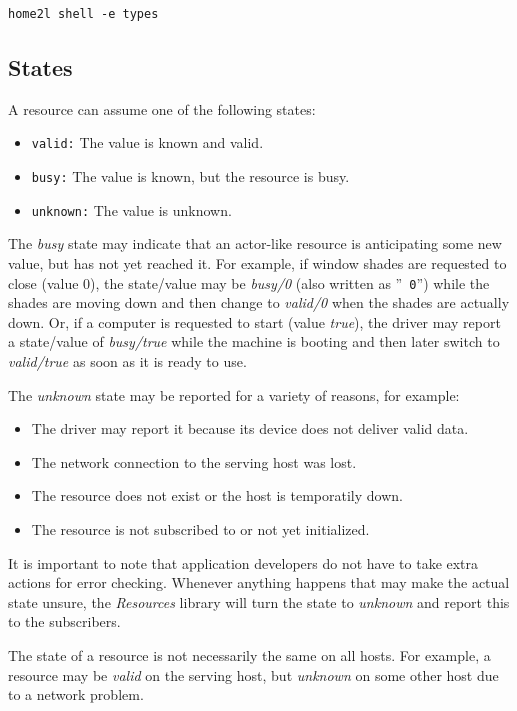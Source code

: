 \documentclass[12pt,english,parskip=half]{scrreprt}
\begin{document}
\begin{lstlisting}
home2l shell -e types
\end{lstlisting}



\subsection{States}

A resource can assume one of the following states:

\begin{itemize}
\item
  \texttt{valid:} The value is known and valid.
\item
  \texttt{busy:} The value is known, but the resource is busy.
\item
  \texttt{unknown:} The value is unknown.
\end{itemize}

The \emph{busy} state may indicate that an actor-like resource is
anticipating some new value, but has not yet reached it. For example, if
window shades are requested to close (value 0), the state/value may be
\emph{busy/0} (also written as ''\texttt{~0}'') while the shades are
moving down and then change to \emph{valid/0} when the shades are
actually down. Or, if a computer is requested to start (value \emph{true}),
the driver may report a state/value of \emph{busy/true} while
the machine is booting and then later switch to \emph{valid/true} as soon as
it is ready to use.

The \emph{unknown} state may be reported for a variety of reasons, for example:
\begin{itemize}
\item
  The driver may report it because its device does not deliver valid data.
\item
  The network connection to the serving host was lost.
\item
  The resource does not exist or the host is temporatily down.
\item
  The resource is not subscribed to or not yet initialized.
\end{itemize}

It is important to note that application developers do not have to take
extra actions for error checking. Whenever anything happens that may
make the actual state unsure, the \emph{Resources} library will turn the
state to \emph{unknown} and report this to the subscribers.

The state of a resource is not necessarily the same on all hosts. For example, a resource
may be \emph{valid} on the serving host, but \emph{unknown} on some other host due to
a network problem.
\end{document}
